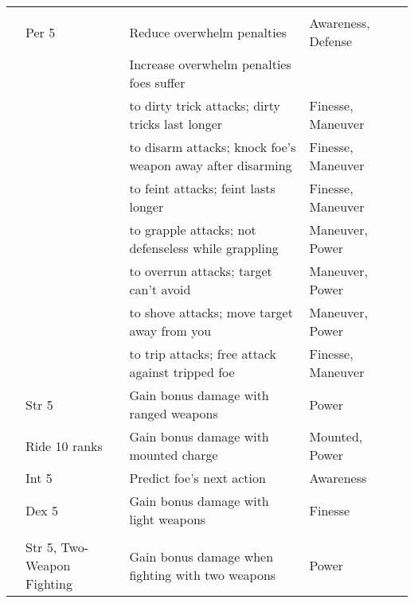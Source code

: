 \begin{longtabuwrapper}
\begin{longtabu}{>{\lcol}p{10em} >{\lcol}p{15em} >{\lcol}X >{\lcol}p{6em} >{\lcol}p{3em}}
        \midrule
         &  &  &  &  \\
         & Per 5 & Reduce overwhelm penalties & Awareness, Defense &  \\
         & \x & Increase overwhelm penalties foes suffer & \x &  \\
         & \x &  to dirty trick attacks; dirty tricks last longer & Finesse, Maneuver &  \\
         & \x &  to disarm attacks; knock foe's weapon away after disarming & Finesse, Maneuver &  \\
         & \x &  to feint attacks; feint lasts longer & Finesse, Maneuver &  \\
         & \x &  to grapple attacks; not defenseless while grappling & Maneuver, Power &  \\
         & \x &  to overrun attacks; target can't avoid & Maneuver, Power &  \\
         & \x &  to shove attacks; move target away from you & Maneuver, Power &  \\
         & \x &  to trip attacks; free attack against tripped foe & Finesse, Maneuver &  \\
         & Str 5 & Gain bonus damage with ranged weapons & Power &  \\
         & Ride 10 ranks & Gain bonus damage with mounted charge & Mounted, Power &  \\
         & Int 5 & Predict foe's next action & Awareness &  \\
         & Dex 5 & Gain bonus damage with light weapons & Finesse &  \\

        \midrule
         &  &  &  &  \\
         & Str 5, Two-Weapon Fighting & Gain bonus damage when fighting with two weapons & Power &  \\


\end{longtabu}
\end{longtabuwrapper}
